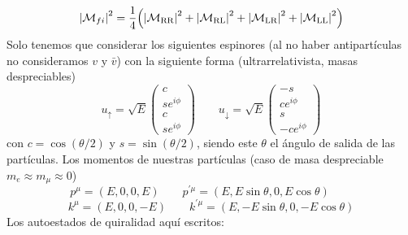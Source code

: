 \begin{equation}
	\vqty{\Mcal_{fi}}^2 = \frac{1}{4} \pqty{\vqty{\Mcal_{\text{RR}}}^2+\vqty{\Mcal_{\text{RL}}}^2
		+\vqty{\Mcal_{\text{LR}}}^2+\vqty{\Mcal_{\text{LL}}}^2}
\end{equation}
Solo tenemos que considerar los siguientes espinores (al no haber antipartículas no consideramos $v$ y $\bar{v}$) con  la siguiente forma (ultrarrelativista, masas despreciables)
\begin{equation}
	u_\uparrow = \sqrt{E} \begin{pmatrix}
		c \\ se^{i\phi} \\ c \\ se^{i\phi}
	\end{pmatrix} \qquad
	u_\downarrow= \sqrt{E} \begin{pmatrix}
		-s \\ ce^{i\phi} \\ s \\ -ce^{i\phi}
	\end{pmatrix}
\end{equation}
con $c=\cos (\theta/2)$ y $s=\sin(\theta/2)$, siendo este $\theta$ el ángulo de salida de las partículas. Los momentos de nuestras partículas (caso de masa despreciable $m_e\approx m_\mu\approx 0$)
\begin{equation}
    p^\mu= (E,0,0,E) \qquad 
    p^{\prime\mu}= (E,E\sin \theta,0,E \cos \theta) \qquad 
\end{equation}
\begin{equation}
    k^\mu= (E,0,0,-E) \qquad 
    k^{\prime\mu}= (E,-E\sin \theta,0,-E \cos \theta)
\end{equation}
Los autoestados de quiralidad aquí escritos: 

